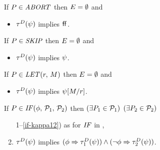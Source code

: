 \begin{definition}
  \label{def:pomsets-trans}

  \noindent
  If $P\in\textnormal{\textit{ABORT}}$ then $E = \emptyset$ and
  \begin{itemize}
  \item $\aTr{\bEvs}{\bForm}$ implies $\mkern.6mu\mathsf{ff}\mkern.6mu$.
  \end{itemize}

  \noindent
  If $P\in\textnormal{\textit{SKIP}}$ then $E = \emptyset$ and
  \begin{itemize}
  \item $\aTr{\bEvs}{\bForm}$ implies $\psi$.
  \end{itemize}

  \noindent
  If $\aPS\in\sLET{\aReg}{\aExp}$ then $E = \emptyset$ and
  \begin{itemize}
  \item $\aTr{\bEvs}{\bForm}$ implies $\psi[M/r]$.
  \end{itemize}

  \noindent
  If $\aPS \in \sIF{\aForm}\sTHEN\aPSS_1\sELSE\aPSS_2\sFI$ then
  $(\exists P_1\in\mathcal{P}_1)$ $(\exists P_2\in\mathcal{P}_2)$
  \begin{enumerate}
    \setcounter{enumi}{\value{pomsetPreIfCount}}
  \item[1--\ref{if-kappa12})] as for $\sIF{}$ in ,
  \item \label{if-tau}
    $\aTr{\bEvs}{\bForm}$ implies
    $(\aForm\limplies\aTr[1]{\bEvs}{\bForm})\land(\neg\aForm\limplies\aTr[2]{\bEvs}{\bForm})$.
  \end{enumerate}


\end{definition}
